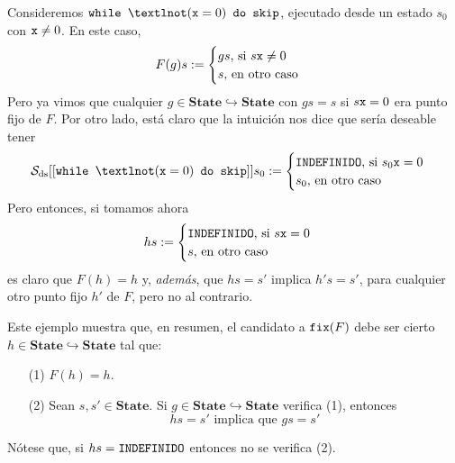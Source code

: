 \begin{example}
Consideremos $\n{while } ¬(\n{x}=0)\n{ do skip}$, ejecutado desde un estado $s_0$ con $\texttt{x}\neq 0$. En este caso, 
$$F(g)s := \begin{cases}
    gs \text{, si } s\texttt{x} \neq 0\\
    s \text{, en otro caso}
\end{cases}$$
Pero ya vimos que cualquier $g \in \mathbf{State}\hookrightarrow\mathbf{State}$ con $gs = s$ si $s\texttt{x} = 0$ era punto fijo de $F$. Por otro lado, está claro que la intuición nos dice que sería deseable tener
$$\mc{S}_\nn{ds}[[\n{while } ¬(\n{x}=0)\n{ do skip}]]s_0 := \begin{cases}
    \n{INDEFINIDO} \text{, si } s_0\n{x} = 0 \\
    s_0 \text{, en otro caso}
\end{cases}$$
Pero entonces, si tomamos ahora
$$hs := \begin{cases}
    \texttt{INDEFINIDO} \text{, si } s\texttt{x} = 0 \\
    s \text{, en otro caso}
\end{cases}$$
es claro que $F(h) = h$ y, \textit{además}, que $hs = s'$ implica $h's = s'$, para cualquier otro punto fijo $h'$ de $F$, pero no al contrario. 
\end{example}
Este ejemplo muestra que, en resumen, el candidato a $\texttt{fix}(F)$ debe ser cierto $h \in \mathbf{State}\hookrightarrow\mathbf{State}$ tal que:
\begin{itemize}
    \item[(1)] $F(h)=h$.
    \item[(2)] Sean $s, s' \in \mathbf{State}$. Si $g \in \mathbf{State}\hookrightarrow\mathbf{State}$ verifica (1), entonces
    $$hs =s' \text{ implica que } gs=s'$$
\end{itemize}
Nótese que, si $hs = \texttt{INDEFINIDO}$ entonces no se verifica (2). 


